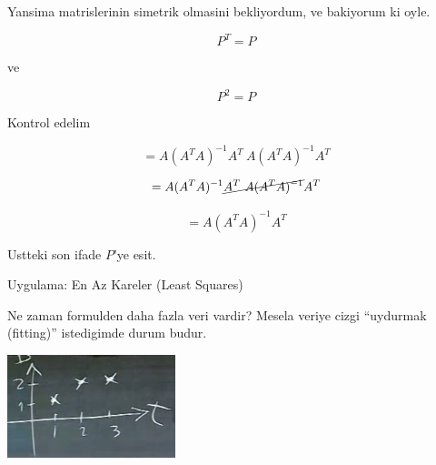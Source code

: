 \documentclass[12pt,fleqn]{article}\usepackage{../common}
\begin{document}
Yansima matrislerinin simetrik olmasini bekliyordum, ve bakiyorum ki oyle. 

\[ P^T = P \]

ve 

\[ P^2 = P \]

Kontrol edelim

\[=  A(A^TA)^{-1}A^T \ A(A^TA)^{-1}A^T \]

\[=  A(A^TA)^{-1}\cancel{A^T \ A(A^TA)^{-1}}A^T \]

\[=  A(A^TA)^{-1}A^T \]

Ustteki son ifade $P$'ye esit. 

Uygulama: En Az Kareler (Least Squares)

Ne zaman formulden daha fazla veri vardir? Mesela veriye cizgi ``uydurmak
(fitting)'' istedigimde durum budur. 

\includegraphics[height=3cm]{15_6.png}
\end{document}
